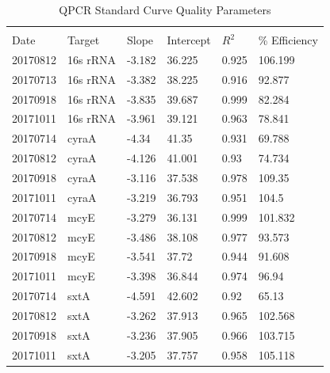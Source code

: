 
\setcounter{table}{0}
\renewcommand{\thetable}{\Alph{chapter}\arabic{table}}
 \label{ch:extra}

\begin{center}
\begin{table}[]
	\caption{QPCR Standard Curve Quality Parameters}
	\label{tab:qpcr}
	\begin{center}
\begin{tabular}{llllll} 
	\hline \\
	
Date     & Target   & Slope  & Intercept & $R^2$ & \% Efficiency \\
20170812 & 16s rRNA & -3.182 & 36.225    & 0.925 & 106.199        \\
20170713 & 16s rRNA & -3.382 & 38.225    & 0.916 & 92.877         \\
20170918 & 16s rRNA & -3.835 & 39.687    & 0.999 & 82.284         \\
20171011 & 16s rRNA & -3.961 & 39.121    & 0.963 & 78.841         \\
20170714 & cyraA    & -4.34  & 41.35     & 0.931 & 69.788         \\
20170812 & cyraA    & -4.126 & 41.001    & 0.93  & 74.734         \\
20170918 & cyraA    & -3.116 & 37.538    & 0.978 & 109.35         \\
20171011 & cyraA    & -3.219 & 36.793    & 0.951 & 104.5          \\
20170714 & mcyE     & -3.279 & 36.131    & 0.999 & 101.832        \\
20170812 & mcyE     & -3.486 & 38.108    & 0.977 & 93.573         \\
20170918 & mcyE     & -3.541 & 37.72     & 0.944 & 91.608         \\
20171011 & mcyE     & -3.398 & 36.844    & 0.974 & 96.94          \\
20170714 & sxtA     & -4.591 & 42.602    & 0.92  & 65.13          \\
20170812 & sxtA     & -3.262 & 37.913    & 0.965 & 102.568        \\
20170918 & sxtA     & -3.236 & 37.905    & 0.966 & 103.715        \\
20171011 & sxtA     & -3.205 & 37.757    & 0.958 & 105.118   \\ \hline
\end{tabular}
\end{center}
\end{table}


\end{center}
